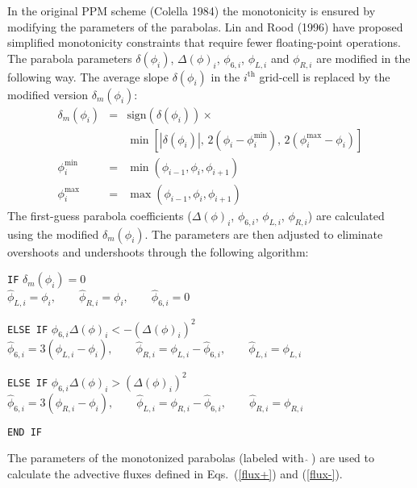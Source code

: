   In the original PPM scheme (Colella 1984) the monotonicity is ensured
  by modifying the parameters of the parabolas. Lin and Rood (1996) have
  proposed simplified monotonicity constraints that require fewer
  floating-point operations. The parabola parameters $\delta(\phi_{i})$,
  $\Delta(\phi)_{i}$, $\phi_{6,i}$, $\phi_{L,i}$ and $\phi_{R,i}$ are
  modified in the following way. The average slope $\delta(\phi_{i})$ in
  the $i^{\mathrm{th}}$ grid-cell is replaced by the modified version
  $\delta_{m}(\phi_{i})$:  
  \begin{eqnarray}
    \delta_{m}(\phi_{i}) &=& \mathrm{sign}(\delta(\phi_{i})) \times \\
    \nonumber
    & & \min \left [ |\delta(\phi_{i}) |, \,
      2(\phi_{i}-\phi^{\mathrm{min}}_{i}), \, 2(\phi^{\mathrm{max}}_{i} -
    \phi_{i}) \right ] \\    \nonumber
    \phi^{\mathrm{min}}_{i}&=& \min (\phi_{i-1}, \phi_{i},
    \phi_{i+1}) \\ \nonumber
    \phi^{\mathrm{max}}_{i} &=& \max (\phi_{i-1}, \phi_{i}, \phi_{i+1})
  \end{eqnarray}
  The first-guess parabola coefficients ($\Delta(\phi)_{i}$,
  $\phi_{6,i}$, $\phi_{L,i}$, $\phi_{R,i}$) are calculated using the
  modified $\delta_{m}(\phi_{i})$. The parameters are then adjusted to
  eliminate overshoots and undershoots through the following algorithm:
  \begin{description}
    \label{ppm01}
    \item \texttt{IF} \hspace{5mm} $\delta_{m}(\phi_{i}) = 0$ \\       
       $\hat{\phi}_{L,i} = \phi_{i}, \qquad \hat{\phi}_{R,i} = \phi_{i}, \qquad
       \hat{\phi}_{6,i} = 0$
    \item \texttt{ELSE IF} \hspace{5mm} $\phi_{6,i} \Delta(\phi)_{i} <
      -(\Delta(\phi)_{i})^{2}$ \\
       $\hat{\phi}_{6,i} = 3(\phi_{L,i} - \phi_{i}), \qquad \hat{\phi}_{R,i} =
       \phi_{L,i} - \hat{\phi}_{6,i}, \qquad \hat{\phi}_{L,i} = \phi_{L,i}$
    \item \texttt{ELSE IF} \hspace{5mm} $\phi_{6,i} \Delta(\phi)_{i} >
      (\Delta(\phi)_{i})^{2}$ \\
       $\hat{\phi}_{6,i} = 3(\phi_{R,i} - \phi_{i}), \qquad \hat{\phi}_{L,i} =
       \phi_{R,i} - \hat{\phi}_{6,i}, \qquad \hat{\phi}_{R,i} =
       \phi_{R,i}$
    \item \texttt{END IF}
  \end{description}
  The parameters of the monotonized parabolas (labeled with
  $\hat{\,}\,$) are used to calculate the advective fluxes defined in
  Eqs.~(\ref{flux+}) and (\ref{flux-}).

